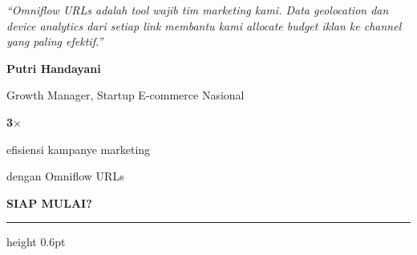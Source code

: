 \documentclass[a4paper]{article}
\newcommand{\sectiontitle}[1]{%
    \vspace{10pt}%
    {\fontsize{13}{16}\selectfont\bfseries\color{BlueDark} #1}\par\vspace{3pt}%
    {\color{BluePrimary}\hrule height 0.6pt}\par\vspace{8pt}%
}
\begin{document}
\noindent
\begin{minipage}[t]{0.485\textwidth}
    \colorbox{BlueBg}{%
        \begin{minipage}{\dimexpr\linewidth-2\fboxsep\relax}
            \vspace{6pt}
            {\fontsize{9.5}{13}\selectfont\color{TextDark}\textit{``Omniflow URLs adalah tool wajib tim marketing kami. Data geolocation dan device analytics dari setiap link membantu kami allocate budget iklan ke channel yang paling efektif.''}}\par\vspace{4pt}
            {\fontsize{8.5}{11}\selectfont\bfseries\color{BluePrimary} Putri Handayani}\par
            {\fontsize{8}{10}\selectfont\color{TextLight} Growth Manager, Startup E-commerce Nasional}
            \vspace{6pt}
        \end{minipage}}
\end{minipage}%
\hfill
\begin{minipage}[t]{0.485\textwidth}
    \colorbox{BlueBg}{%
        \begin{minipage}{\dimexpr\linewidth-2\fboxsep\relax}
            \vspace{6pt}
            \begin{center}
                {\fontsize{20}{24}\selectfont\bfseries\color{CyanPrimary} 3$\times$}\par
                {\fontsize{9.5}{12}\selectfont\color{TextDark} efisiensi kampanye marketing}\par
                {\fontsize{9.5}{12}\selectfont\color{TextDark} dengan Omniflow URLs}
            \end{center}
            \vspace{6pt}
        \end{minipage}}
\end{minipage}

\sectiontitle{SIAP MULAI?}
\end{document}
